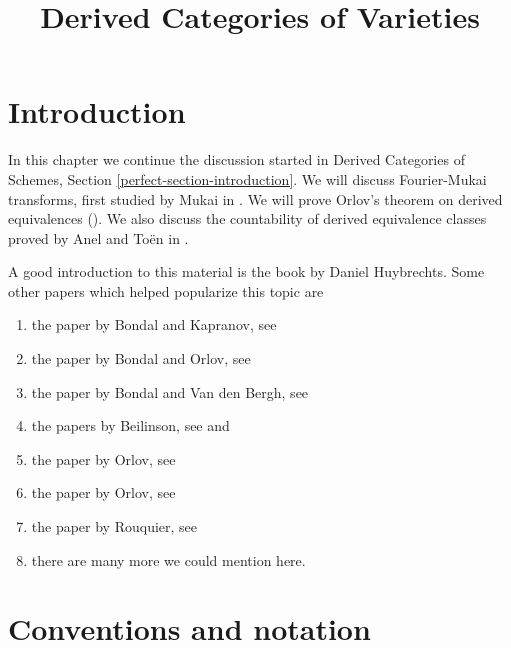 

%


\title{Derived Categories of Varieties}


\maketitle

\label{section-phantom}

\tableofcontents

\section{Introduction}
\label{section-introduction}

\noindent
In this chapter we continue the discussion started in
Derived Categories of Schemes, Section \ref{perfect-section-introduction}.
We will discuss Fourier-Mukai transforms,
first studied by Mukai in \cite{Mukai}.
We will prove Orlov's theorem on derived equivalences (\cite{Orlov-K3}).
We also discuss the countability of derived equivalence
classes proved by Anel and To\"en in \cite{AT}.

\medskip\noindent
A good introduction to this material is the book
\cite{Huybrechts} by Daniel Huybrechts. Some other
papers which helped popularize this topic are
\begin{enumerate}
\item the paper by Bondal and Kapranov, see \cite{Bondal-Kapranov}
\item the paper by Bondal and Orlov, see \cite{Bondal-Orlov}
\item the paper by Bondal and Van den Bergh, see \cite{BvdB}
\item the papers by Beilinson, see
\cite{Beilinson} and \cite{Beilinson-derived}
\item the paper by Orlov, see \cite{Orlov-AV}
\item the paper by Orlov, see \cite{Orlov-motives}
\item the paper by Rouquier, see \cite{Rouquier-dimensions}
\item there are many more we could mention here.
\end{enumerate}




\section{Conventions and notation}
\label{section-conventions}

